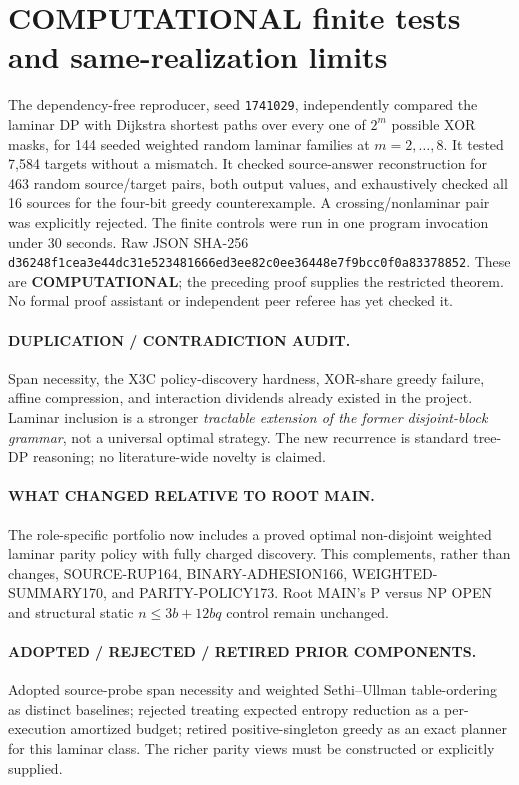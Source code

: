 \documentclass[11pt]{article}
\begin{document}
\section{COMPUTATIONAL finite tests and same-realization limits}
The dependency-free reproducer, seed \texttt{1741029}, independently compared the laminar DP with Dijkstra shortest paths over every one of $2^m$ possible XOR masks, for 144 seeded weighted random laminar families at $m=2,\ldots,8$. It tested 7,584 targets without a mismatch. It checked source-answer reconstruction for 463 random source/target pairs, both output values, and exhaustively checked all 16 sources for the four-bit greedy counterexample. A crossing/nonlaminar pair was explicitly rejected. The finite controls were run in one program invocation under 30 seconds. Raw JSON SHA-256 \texttt{d36248f1cea3e44dc31e523481666ed3ee82c0ee36448e7f9bcc0f0a83378852}. These are \textbf{COMPUTATIONAL}; the preceding proof supplies the restricted theorem. No formal proof assistant or independent peer referee has yet checked it.

\paragraph{DUPLICATION / CONTRADICTION AUDIT.} Span necessity, the X3C policy-discovery hardness, XOR-share greedy failure, affine compression, and interaction dividends already existed in the project. Laminar inclusion is a stronger \emph{tractable extension of the former disjoint-block grammar}, not a universal optimal strategy. The new recurrence is standard tree-DP reasoning; no literature-wide novelty is claimed.

\paragraph{WHAT CHANGED RELATIVE TO ROOT MAIN.} The role-specific portfolio now includes a proved optimal non-disjoint weighted laminar parity policy with fully charged discovery. This complements, rather than changes, SOURCE-RUP164, BINARY-ADHESION166, WEIGHTED-SUMMARY170, and PARITY-POLICY173. Root MAIN's P versus NP OPEN and structural static $n\le3b+12bq$ control remain unchanged.

\paragraph{ADOPTED / REJECTED / RETIRED PRIOR COMPONENTS.} Adopted source-probe span necessity and weighted Sethi--Ullman table-ordering as distinct baselines; rejected treating expected entropy reduction as a per-execution amortized budget; retired positive-singleton greedy as an exact planner for this laminar class. The richer parity views must be constructed or explicitly supplied.
\end{document}
